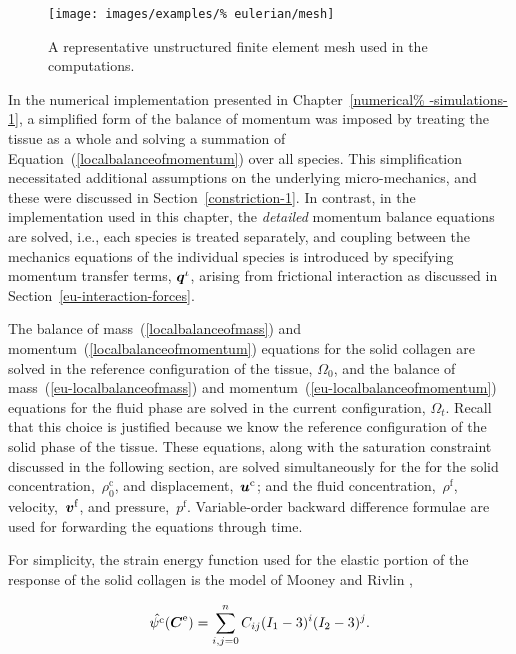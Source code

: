 \begin{figure}[ht]
  \centering
  \texttt{[image: images/examples/\%
    eulerian/mesh]}
  \caption{A representative unstructured finite element mesh used in
    the computations.}
  \label{egmesh2d}
\end{figure}

In the numerical implementation presented in Chapter~\ref{numerical%
  -simulations-1}, a simplified form of the balance of momentum was
imposed by treating the tissue as a whole and solving a summation of
Equation~(\ref{localbalanceofmomentum}) over all species. This
simplification necessitated additional assumptions on the underlying
micro-mechanics, and these were discussed in
Section~\ref{constriction-1}. In contrast, in the implementation used
in this chapter, the {\em detailed} momentum balance equations are
solved, i.e., each species is treated separately, and coupling between
the mechanics equations of the individual species is introduced by
specifying momentum transfer terms, $\mbox{\boldmath$ q$}^{\iota}$, arising from
frictional interaction as discussed in
Section~\ref{eu-interaction-forces}.

The balance of mass~(\ref{localbalanceofmass}) and
momentum~(\ref{localbalanceofmomentum}) equations for the solid
collagen are solved in the reference configuration of the tissue,
$\Omega_{0}$, and the balance of mass~(\ref{eu-localbalanceofmass})
and momentum~(\ref{eu-localbalanceofmomentum}) equations for the fluid
phase are solved in the current configuration, $\Omega_{t}$. Recall
that this choice is justified because we know the reference
configuration of the solid phase of the tissue. These equations, along
with the saturation constraint discussed in the following section, are
solved simultaneously for the for the solid
concentration,~$\rho_{0}^{\mathrm{c}}$, and
displacement,~$\mbox{\boldmath$ u$}^{\mathrm{c}}$; and the fluid
concentration,~$\rho^{\mathrm{f}}$, velocity,~$\mbox{\boldmath$ v$}^{\mathrm{f}}$, and
pressure,~$p^{\mathrm{f}}$. Variable-order backward difference
formulae \citep{leveque2007} are used for forwarding the equations
through time.

For simplicity, the strain energy function used for the elastic
portion of the response of the solid collagen is the model
of Mooney and Rivlin \citep{mooney1940},

\begin{equation}
\hat{\psi^{\mathrm{c}}} (\mbox{\boldmath$ C$}^{\mathrm{e}}) = \sum\limits_{i,j=0}^{n}
C_{ij} (I_{1}-3)^{i} (I_{2}-3)^{j}.
\end{equation}

